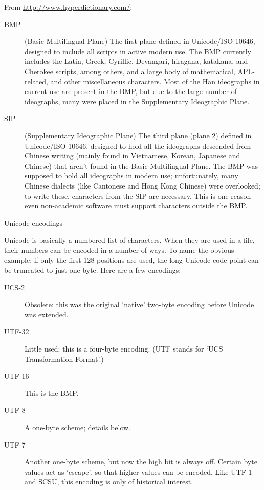 From \url{http://www.hyperdictionary.com/}:
\begin{description}
\item[BMP] (Basic Multilingual Plane) The first plane defined in
  Unicode/ISO 10646, designed to include all scripts in active modern
  use. The BMP currently includes the Latin, Greek, Cyrillic,
  Devangari, hiragana, katakana, and Cherokee scripts, among others,
  and a large body of mathematical, APL-related, and other
  miscellaneous characters. Most of the Han ideographs in current use
  are present in the BMP, but due to the large number of ideographs,
  many were placed in the Supplementary Ideographic Plane.
\item[SIP] (Supplementary Ideographic Plane) The third plane (plane 2)
  defined in Unicode/ISO 10646, designed to hold all the ideographs
  descended from Chinese writing (mainly found in Vietnamese, Korean,
  Japanese and Chinese) that aren't found in the Basic Multilingual
  Plane. The BMP was supposed to hold all ideographs in modern use;
  unfortunately, many Chinese dialects (like Cantonese and Hong Kong
  Chinese) were overlooked; to write these, characters from the SIP
  are necessary. This is one reason even non-academic software must
  support characters outside the BMP.
\end{description}

 {Unicode encodings}
\label{sec:uni-encoding}

Unicode is basically a numbered list of characters. When they are used
in a file, their numbers can be encoded in a number of ways. To name
the obvious example: if only the first 128 positions are used, the
long Unicode code point can be truncated to just one byte. Here are a
few encodings:
\begin{description}
\item[UCS-2] Obsolete: this was the original `native' two-byte
  encoding before Unicode was extended.
\item[UTF-32] Little used: this is a four-byte encoding. (UTF stands
  for `UCS Transformation Format'.)
\item[UTF-16] This is the BMP.
\item[UTF-8] A one-byte scheme; details below.
\item[UTF-7] Another one-byte scheme, but now the high bit is always
  off. Certain byte values act as `escape', so that higher values can
  be encoded. Like UTF-1 and SCSU, this encoding is only of historical
  interest.
\end{description}

